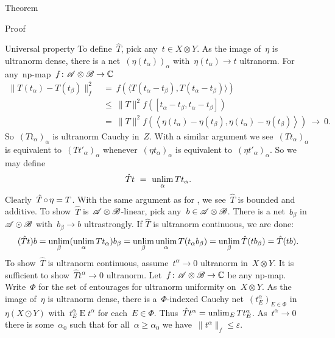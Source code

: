 \begin{parsec}
\begin{point}{Theorem}
\begin{point}{Proof}
\begin{point}{Universal property}
To define~$\hat{T}$, pick any~$t \in X \otimes Y$.
As the image of~$\eta$ is ultranorm dense,
there is a net~$(\eta(t_\alpha))_\alpha$ with~$\eta(t_\alpha) \to t$ ultranorm.
For any~np-map~$f\colon \mathscr{A}\otimes \mathscr{B} \to \mathbb{C}$
\begin{align*}
    \|T(t_\alpha) - T(t_\beta) \|_f^2 
        &\ =\ f(\langle T(t_\alpha - t_\beta), T(t_\alpha - t_\beta) \rangle) \\
        & \ \leq \ \|T\|^2 f([t_\alpha-t_\beta, t_\alpha - t_\beta]) \\
        & \ = \ \|T\|^2 f(\left<\eta (t_\alpha)-\eta(t_\beta), \eta(t_\alpha) - \eta(t_\beta)\right>) \ \to\  0.
\end{align*}
So~$(T t_\alpha)_\alpha$ is ultranorm Cauchy in~$Z$.
With a similar argument we see~$(Tt_\alpha)_\alpha $
    is equivalent to~$ (T t'_\alpha)_\alpha$
whenever~$(\eta t_\alpha)_\alpha $ is equivalent
    to~$ (\eta t'_\alpha)_\alpha$.
So we may define
\begin{equation*}
\hat{T} t \ = \ \unlim_\alpha T t_\alpha.
\end{equation*}
Clearly~$\hat{T} \mathop{\circ} \eta = T$.
With the same argument as for ,
    we see~$\hat{T}$ is bounded and additive.
To show~$\hat{T}$ is~$\mathscr{A}\otimes \mathscr{B}$-linear,
    pick any~$b \in \mathscr{A} \otimes \mathscr{B}$.
There is a net~$b_\beta$ in~$\mathscr{A} \odot \mathscr{B}$
    with~$b_\beta \to b$ ultrastrongly.
If $\hat{T}$ is ultranorm continuous, we are done:
\begin{equation*}
    (\hat{T} t) b
    = \unlim_\beta (\unlim_\alpha T t_\alpha) b_\beta\\
     = \unlim_\beta \unlim_\alpha T (t_\alpha b_\beta) \\
     = \unlim_\beta \hat{T} (t b_\beta)\\
     = \hat{T} (tb).
\end{equation*}
To show~$\hat{T}$ is ultranorm continuous,
    assume~$t^\alpha \to 0$ ultranorm in~$X \otimes Y$.
It is sufficient to show~$\hat{T} t^\alpha \to 0$ ultranorm.
Let~$f\colon \mathscr{A}\otimes \mathscr{B} \to \mathbb{C}$ be any np-map.
Write~$\Phi$ for the set of entourages for ultranorm uniformity
    on~$X \otimes Y$.
As the image of~$\eta$ is ultranorm dense,
there is a~$\Phi$-indexed Cauchy net~$(t^\alpha_E)_{E \in \Phi}$ in
    $\eta (X \odot Y)$
    with~$t^\alpha_E \mathrel{E} t^\alpha$
    for each~$E \in \Phi$.
Thus~$\hat{T} t^\alpha = \unlim_E T t^\alpha_E$.
As~$t^\alpha \to 0$
    there is some~$\alpha_0$
    such that for all~$\alpha \geq \alpha_0$
    we have~$\|t^\alpha \|_f \leq \varepsilon$.

\end{point}
\end{point}
\end{point}
\end{parsec}
